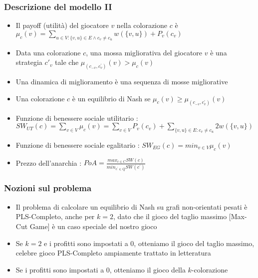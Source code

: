 \documentclass{beamer}
\begin{document}
\begin{frame}
\frametitle{Descrizione del modello II}
\begin{itemize}
	\item Il \alert{payoff} (utilità) del giocatore $v$ nella colorazione $c$ è $\mu_c (v) = \sum_{u \in V:\{v, u\} \in E \wedge c_v \neq c_u} w(\{v, u\}) + P_v(c_v)$
	\item Data una colorazione $c$, una \alert{mossa migliorativa} del giocatore $v$ è una strategia $c'_v$ tale che $\mu_{(c_{-v}, c_v^{\prime})} (v) > \mu_c (v)$
	\item Una \alert{dinamica di miglioramento} è una sequenza di mosse migliorative
	\item Una colorazione $c$ è un \alert{equilibrio di Nash} se $\mu_c (v) \geq \mu_{(c_{-v}, c_v^{\prime})} (v)$
	\item \alert{Funzione di benessere sociale utilitario} : $SW_{UT} (c) = \sum_{v \in V} \mu_c (v) = \sum_{v \in V} P_v(c_v) + \sum_{\{v, u\} \in E : c_v \neq c_u} 2w(\{v, u\})$
	\item \alert{Funzione di benessere sociale egalitario} : $SW_{EG} (c) = min_{v \in V} \mu_c (v)$
	\item \alert{Prezzo dell'anarchia} : $PoA = \frac{max_{c \in C} SW(c)}{min_{c^{\prime} \in Q} SW(c^{\prime})}$
\end{itemize}
\end{frame}


\begin{frame}
\frametitle{Nozioni sul problema}
\begin{itemize}
	\item Il problema di calcolare un equilibrio di Nash su grafi non-orientati pesati è \alert{PLS-Completo}, anche per $k=2$, dato che il gioco del taglio massimo [Max-Cut Game] è un caso speciale del nostro gioco
	\item Se $k=2$ e i profitti sono impostati a $0$, otteniamo il \alert{gioco del taglio massimo}, celebre gioco PLS-Completo ampiamente trattato in letteratura
	\item Se i profitti sono impostati a $0$, otteniamo il \alert{gioco della $k$-colorazione}
\end{itemize}
\end{frame}
\end{document}
